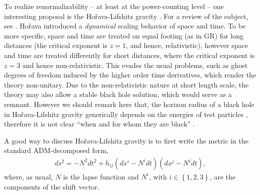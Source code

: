 \documentclass[12pt]{article}
\newcommand{\2}{$^2$}
\newcommand{\3}{$^3$}
\newcommand{\4}{$_4$}
\newcommand{\5}{$_5$}
\begin{document}
\begin{description}
To realize renormalizability -- at least at the power-counting level -- one interesting proposal is the Ho\v{r}ava-Lifshitz gravity \cite{Horava:2009uw}. 
For a review of the subject, see \cite{1010.3218}.
Ho\v{r}ava introduced a \textit{dynamical} scaling behavior of space and time. To be more specific, space and time are treated on equal footing (as in GR) for long distances (the critical exponent is $z=1$, and hence, relativistic), however space and time are treated differently for short distances, where the critical exponent is $z=3$ and hence non-relativistic. This evades the usual problems, such as ghost degrees of freedom induced by the higher order time derivatives, which render the theory non-unitary. 
Due to the non-relativistic nature at short length scale, the theory may also allow a stable black hole solution, which would serve as a remnant. However we should remark here that, the horizon radius of a black hole in Ho\v{r}ava-Lifshitz gravity generically depends on the energies of test particles \cite{1105.4259}, therefore it is not clear ``when
and for whom they are black'' \cite{0910.5487}.

A good way to discuss Ho\v{r}ava-Lifshitz gravity is to first write the metric in the standard ADM-decomposed form,
\begin{eqnarray}
ds^{2} = -N^{2} dt^{2} + h_{ij} \left( dx^{i} - N^{i} dt \right) \left( dx^{j} - N^{j} dt \right),
\end{eqnarray}
where, as usual, $N$ is the lapse function and $N^i$, with $i \in \left\{1,2,3\right\}$, are the components of the shift vector.


\end{description}
\end{document}
